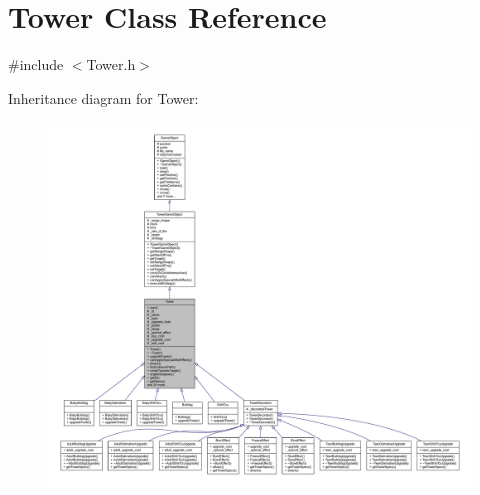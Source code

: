 \hypertarget{class_tower}{\section{Tower Class Reference}
\label{class_tower}
}


{\ttfamily \#include $<$Tower.\+h$>$}



Inheritance diagram for Tower\+:
\nopagebreak
\begin{figure}[H]
\begin{center}
\leavevmode
\includegraphics[width=350pt]{class_tower__inherit__graph}
\end{center}
\end{figure}


